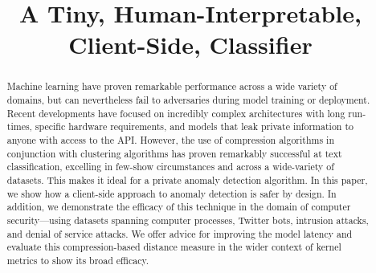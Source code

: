 \documentclass[conference]{IEEEtran}
\begin{document}
\title{A Tiny, Human-Interpretable, Client-Side, Classifier}


\author{
    
 
    
    
}

\maketitle

\begin{abstract}
    Machine learning have proven remarkable performance across a wide variety of domains, but can nevertheless fail to adversaries during model training or deployment.
    Recent developments have focused on incredibly complex architectures with long run-times, specific hardware requirements, and models that leak private information to anyone with access to the API.
    However, the use of compression algorithms in conjunction with clustering algorithms has proven remarkably successful at text classification, excelling in few-show circumstances and across a wide-variety of datasets. This makes it ideal for a private anomaly detection algorithm.
    In this paper, we show how a client-side approach to anomaly detection is safer by design.
    In addition, we demonstrate the efficacy of this technique in the domain of computer security---using datasets spanning computer processes, Twitter bots, intrusion attacks, and denial of service attacks.
    We offer advice for improving the model latency and evaluate this compression-based distance measure in the wider context of kernel metrics to show its broad efficacy.
\end{abstract}
\end{document}
